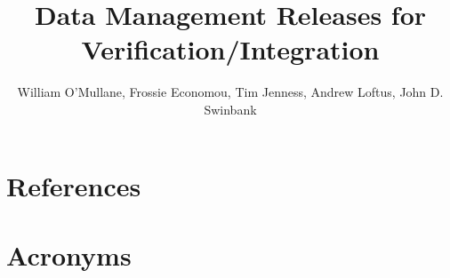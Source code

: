 \documentclass[DM,toc]{lsstdoc}
\title[DM Releases]{Data Management Releases for Verification/Integration}
\author   {William O'Mullane, Frossie Economou, Tim Jenness, Andrew Loftus, John D. Swinbank}
\begin{document}
%
%
\maketitle

%
%



\section{References\label{sect:references}}
\renewcommand{\refname}{}


\section{Acronyms}
\end{document}
